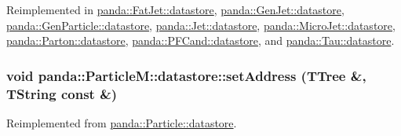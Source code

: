 Reimplemented in \hyperlink{structpanda_1_1FatJet_1_1datastore_ac707315048c1fe184534202259fbdda9}{panda::FatJet::datastore}, \hyperlink{structpanda_1_1GenJet_1_1datastore_a6b6d0feb6fe978115c45180cccb7497b}{panda::GenJet::datastore}, \hyperlink{structpanda_1_1GenParticle_1_1datastore_a28a604490b71305ae71b9671e3ea0bdf}{panda::GenParticle::datastore}, \hyperlink{structpanda_1_1Jet_1_1datastore_a8de9fbcd55c17f7d3d022088f6ded487}{panda::Jet::datastore}, \hyperlink{structpanda_1_1MicroJet_1_1datastore_a9570f85bfad7f55e239670d0f364cb8b}{panda::MicroJet::datastore}, \hyperlink{structpanda_1_1Parton_1_1datastore_a85ed8f023c9fddb6ada93150e4d03c22}{panda::Parton::datastore}, \hyperlink{structpanda_1_1PFCand_1_1datastore_a3e3acf6cc81f4ebe16220a7931b3bb2d}{panda::PFCand::datastore}, and \hyperlink{structpanda_1_1Tau_1_1datastore_a1dce455474842a78eb6a7ab7b3271f3a}{panda::Tau::datastore}.\hypertarget{structpanda_1_1ParticleM_1_1datastore_ab9f9e7afb145c12941baa10892ed1811}{
\subsubsection[{setAddress}]{\setlength{\rightskip}{0pt plus 5cm}void panda::ParticleM::datastore::setAddress (TTree \&, \/  TString const \&)}}
\label{structpanda_1_1ParticleM_1_1datastore_ab9f9e7afb145c12941baa10892ed1811}


Reimplemented from \hyperlink{structpanda_1_1Particle_1_1datastore_a3e4a1f8d223d8378ef2b92a6d4ccd2b0}{panda::Particle::datastore}.

